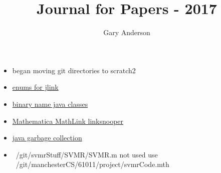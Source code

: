 \documentclass[hyperref]{labbook}
\begin{document}
\frontmatter

\title{Journal for Papers  - 2017}
\author{Gary Anderson }
\maketitle

\printindex
\tableofcontents

\mainmatter




\begin{itemize}
\item began moving git directories to scratch2
\end{itemize}


\begin{itemize}
\item \href{https://mathematica.stackexchange.com/questions/22714/using-enum-values-with-j-link}{enums for jlink}
\item \href{http://docs.oracle.com/javase/specs/jls/se7/html/jls-13.html#jls-13.1}{binary name java classes}
\end{itemize}



\begin{itemize}
\item \href{http://reference.wolfram.com/language/JLink/ref/java/com/wolfram/jlink/util/LinkSnooper.html}{Mathematica MathLink linksnooper}
\item \href{http://www.oracle.com/technetwork/java/javase/memorymanagement-whitepaper-150215.pdf}{java garbage collection}
\end{itemize}



\begin{itemize}
\item ~/git/svmrStuff/SVMR/SVMR.m not used  use ~/git/manchesterCS/61011/project/svmrCode.mth
\end{itemize}
\end{document}
